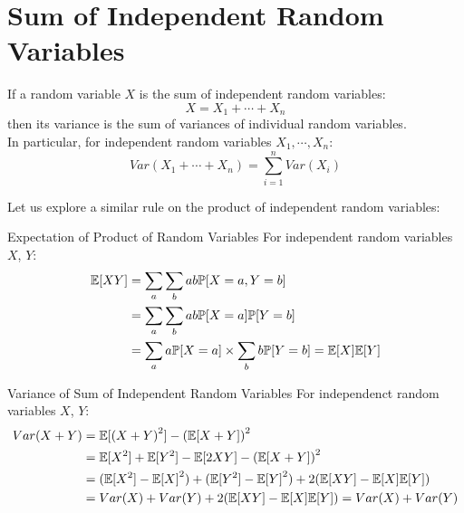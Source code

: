 \section{Sum of Independent Random Variables}
If a random variable $X$ is the sum of independent random variables:
\[X = X_1 + \cdots + X_n\]
then its variance is the sum of variances of individual random variables. \\
In particular, for independent random variables $X_1, \cdots, X_n$:
\[Var(X_1 + \cdots + X_n) = \sum_{i = 1}^n Var(X_i)\]

Let us explore a similar rule on the product of independent random variables:
\begin{ln-theorem}{Expectation of Product of Random Variables}{}
    For independent random variables $X$, $Y$:
    \begin{align*}
        \mathbb{E}[XY] &= \sum_a \sum_b ab \mathbb{P}[X = a, Y = b] \\
        &= \sum_a \sum_b ab \mathbb{P}[X = a] \mathbb{P}[Y = b] \\
        &= \sum_a a \mathbb{P}[X = a] \times \sum_b b \mathbb{P}[Y = b] = \mathbb{E}[X] \mathbb{E}[Y]
    \end{align*}
\end{ln-theorem}
\begin{ln-theorem}{Variance of Sum of Independent Random Variables}{}
    For independenct random variables $X$, $Y$:
    \begin{align*}
        Var(X + Y)
        &= \mathbb{E}[{(X + Y)}^2] - {(\mathbb{E}[X + Y])}^2 \\
        &= \mathbb{E}[X^2] + \mathbb{E}[Y^2] - \mathbb{E}[2XY] - {(\mathbb{E}[X + Y])}^2 \\
        &= (\mathbb{E}[X^2] - {\mathbb{E}[X]}^2) + (\mathbb{E}[Y^2] - {\mathbb{E}[Y]}^2) + 2(\mathbb{E}[XY] - \mathbb{E}[X]\mathbb{E}[Y]) \\
        &= Var(X) + Var(Y) + 2(\mathbb{E}[XY] - \mathbb{E}[X]\mathbb{E}[Y]) = Var(X) + Var(Y)
    \end{align*}
\end{ln-theorem}

